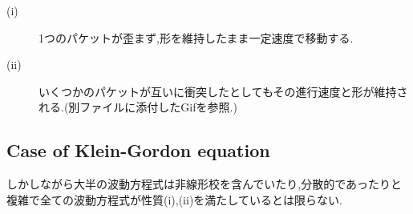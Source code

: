 \documentclass[dvipdfmx,11pt,a4paper]{jsbook}
\begin{document}
\begin{screen}
    \begin{description}
        \item[(i)] 1つのパケットが歪まず,形を維持したまま一定速度で移動する.
        \item[(ii)] いくつかのパケットが互いに衝突したとしてもその進行速度と形が維持される.(別ファイルに添付したGifを参照.)
    \end{description}
\end{screen}
\begin{figure}[H]
    \centering
    \label{2-soliton}
\end{figure}

\subsection{Case of Klein-Gordon equation}
しかしながら大半の波動方程式は非線形校を含んでいたり,分散的であったりと複雑で全ての波動方程式が性質(i),(ii)を満たしているとは限らない.
\end{document}
